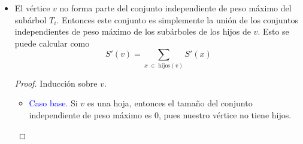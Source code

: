 \documentclass[letterpaper,11pt]{article}
\begin{document}
\begin{enumerate}
\begin{itemize}
\begin{proof}
\begin{itemize}
                \item \textcolor{blue}{Hipótesis de inducción}.Supongamos que se
                cumple para $k$, es decir, supongamos que 
                \begin{equation*}
                    S(k) = w(k) + \sum_{x \; \in \; \text{nietos}(k)} S(x)
                \end{equation*}

                tiene el tamaño del conjunto independiente de peso máximo. 

                \item \textcolor{blue}{Paso inductivo}. Queremos probar que se 
                cumple para $k+1$. Entonces 
                \begin{align*}
                    S(k+1)
                    &= S(k) + w(u) \\
                    &= \left(w(k) + \sum_{x \; \in \; \text{nietos}(k)} S(x)
                       \right) + w(u)
                \end{align*}

                Como $u$ fue agregado al conjunto $S$, eso significa que $u$ 
                es una hoja o es el nieto de un vértice $v$. Por hipótesis de 
                inducción, sabemos que $S(k)$ tiene el tamaño del conjunto 
                independiente de peso máximo. Así, al sumarle $w(u)$ a este 
                valor, obtenemos que $S(k+1)$ tiene el tamaño del conjunto
                independiente de peso máximo.
            \end{itemize}
        \end{proof}

        \item El vértice $v$ no forma parte del conjunto independiente de peso 
        máximo del subárbol $T_i$. Entonces este conjunto es simplemente la 
        unión de los conjuntos independientes de peso máximo de los subárboles 
        de los hijos de $v$. Esto se puede calcular como 
        \begin{equation*}
            S'(v) = \sum_{x \; \in \; \text{hijos}(v)} S'(x)
        \end{equation*} 

        \begin{proof}
            Inducción sobre $v$.
            \begin{itemize}
                \item \textcolor{blue}{Caso base}. Si $v$ es una hoja, entonces 
                el tamaño del conjunto independiente de peso máximo es $0$, 
                pues nuestro vértice no tiene hijos.


\end{itemize}
\end{proof}
\end{itemize}
\end{enumerate}
\end{document}
